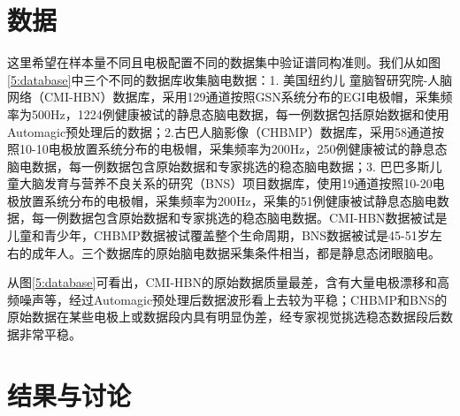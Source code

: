 \section{数据}
这里希望在样本量不同且电极配置不同的数据集中验证谱同构准则。我们从如图\ref{5:database}中三个不同的数据库收集脑电数据：1. 美国纽约儿
童脑智研究院-人脑网络（CMI-HBN）数据库，采用129通道按照GSN系统分布的EGI电极帽，采集频率为500Hz，1224例健康被试的静息态脑电数据，每一例数据包括原始数据和使用Automagic预处理后的数据；2.古巴人脑影像（CHBMP）数据库，采用58通道按照10-10电极放置系统分布的电极帽，采集频率为200Hz，250例健康被试的静息态脑电数据，每一例数据包含原始数据和专家挑选的稳态脑电数据；3. 巴巴多斯儿童大脑发育与营养不良关系的研究（BNS）项目数据库，使用19通道按照10-20电极放置系统分布的电极帽，采集频率为200Hz，采集的51例健康被试静息态脑电数据，每一例数据包含原始数据和专家挑选的稳态脑电数据。CMI-HBN数据被试是儿童和青少年，CHBMP数据被试覆盖整个生命周期，BNS数据被试是45-51岁左右的成年人。三个数据库的原始脑电数据采集条件相当，都是静息态闭眼脑电。

从图\ref{5:database}可看出，CMI-HBN的原始数据质量最差，含有大量电极漂移和高频噪声等，经过Automagic预处理后数据波形看上去较为平稳；CHBMP和BNS的原始数据在某些电极上或数据段内具有明显伪差，经专家视觉挑选稳态数据段后数据非常平稳。

\section{结果与讨论}
